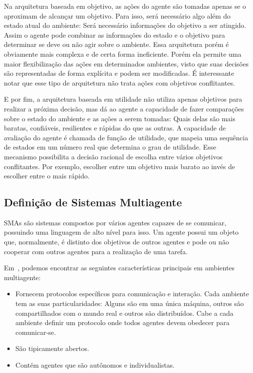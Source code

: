 Na arquitetura baseada em objetivo, as ações do agente são tomadas apenas se o aproximam de alcançar um objetivo. Para isso, será necessário algo além do estado atual do ambiente: Será necessário informações do objetivo a ser atingido. Assim o agente pode combinar as informações do estado e o objetivo para determinar se deve ou não agir sobre o ambiente. Essa arquitetura porém é obviamente mais complexa e de certa forma ineficiente. Porém ela permite uma maior flexibilização das ações em determinados ambientes, visto que suas decisões são representadas de forma explícita e podem ser modificadas. É interessante notar que esse tipo de arquitetura não trata ações com objetivos conflitantes.

E por fim, a arquitetura baseada em utilidade não utiliza apenas objetivos para realizar a próxima decisão, mas dá ao agente a capacidade de fazer comparações sobre o estado do ambiente e as ações a serem tomadas: Quais delas são mais baratas, confiáveis, resilientes e rápidas do que as outras. A capacidade de avaliação do agente é chamada de função de utilidade, que mapeia uma sequência de estados em um número real que determina o grau de utilidade. Esse mecanismo possibilita a decisão racional de escolha entre vários objetivos conflitantes. Por exemplo, escolher entre um objetivo mais barato ao invés de escolher entre o mais rápido.

\subsection{Definição de Sistemas Multiagente}

SMAs são sistemas compostos por vários agentes capazes de se comunicar, possuindo uma linguagem de alto nível para isso. Um agente possui um objeto que, normalmente, é distinto dos objetivos de outros agentes e pode ou não cooperar com outros agentes para a realização de uma tarefa.

Em~\cite{sarmento11}, podemos encontrar as seguintes características principais em ambientes multiagente:
\begin{itemize}
	\item Fornecem protocolos específicos para comunicação e interação. Cada ambiente tem as suas particularidades: Alguns são em uma única máquina, outros são compartilhados com o mundo real e outros são distribuídos. Cabe a cada ambiente definir um protocolo onde todos agentes devem obedecer para comunicar-se.
	\item São tipicamente abertos.
	\item Contém agentes que são autônomos e individualistas.
\end{itemize}

